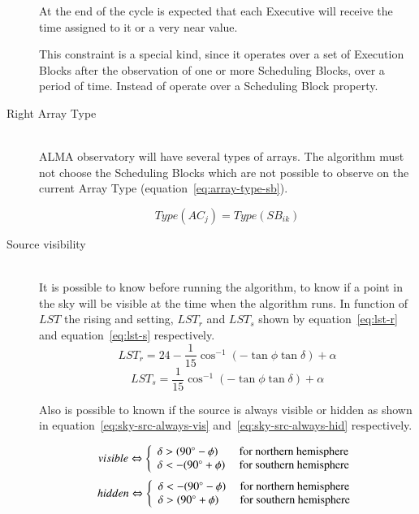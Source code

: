 \begin{description}
At the end of the cycle is expected that each Executive will receive the time assigned to it or a very near value. 

This constraint is a special kind, since it operates over a set of Execution Blocks after the observation of one or more Scheduling Blocks, over a period of time. Instead of operate over a Scheduling Block property.

\item[Right Array Type] \hfill \\
ALMA observatory will have several types of arrays. The algorithm must not choose the Scheduling Blocks which are not possible to observe on the current Array Type (equation~\ref{eq:array-type-sb}).

\begin{equation}
\label{eq:array-type-sb}
Type(AC_j) = Type(SB_{ik})
\end{equation}


\item[Source visibility] \hfill \\
It is possible to know before running the algorithm, to know if a point in the sky will be visible at the time when the algorithm runs.
In function of $LST$ the rising and setting, $LST_r$ and $LST_s$ shown by equation~\ref{eq:lst-r} and equation~\ref{eq:lst-s} respectively.
\begin{equation}
\label{eq:lst-r}
LST_r =  24 - \frac{1}{15} \cos^{-1} (-\tan\phi\tan\delta) + \alpha
\end{equation}
\begin{equation}
\label{eq:lst-s}
LST_s = \frac{1}{15} \cos^{-1} (-\tan\phi \tan\delta) + \alpha
\end{equation}

Also is possible to known if the source is always visible or hidden as shown in equation~\ref{eq:sky-src-always-vis} and~\ref{eq:sky-src-always-hid} respectively.

\begin{equation}
\label{eq:sky-src-always-vis}
visible \Leftrightarrow
\left\{
	\begin{array} {l l}
	\delta > (90^\circ - \phi) & \mbox{ for northern hemisphere} \\
	\delta < -(90^\circ + \phi) & \mbox{ for southern hemisphere} \\
	\end{array} 
\right.
\end{equation}
\begin{equation}
\label{eq:sky-src-always-hid}
hidden \Leftrightarrow
\left\{
	\begin{array} {l l}
	\delta < -(90^\circ - \phi) & \mbox{ for northern hemisphere} \\
	\delta > (90^\circ + \phi) & \mbox{ for southern hemisphere} \\
	\end{array} 
\right.
\end{equation}


\end{description}
